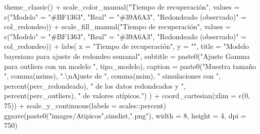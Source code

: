 \documentclass[
]{article}
\newenvironment{Shaded}{\begin{snugshade}}{\end{snugshade}}
\newcommand{\AttributeTok}[1]{\textcolor[rgb]{0.77,0.63,0.00}{#1}}
\newcommand{\DecValTok}[1]{\textcolor[rgb]{0.00,0.00,0.81}{#1}}
\newcommand{\FunctionTok}[1]{\textcolor[rgb]{0.00,0.00,0.00}{#1}}
\newcommand{\NormalTok}[1]{#1}
\newcommand{\OtherTok}[1]{\textcolor[rgb]{0.56,0.35,0.01}{#1}}
\newcommand{\SpecialCharTok}[1]{\textcolor[rgb]{0.00,0.00,0.00}{#1}}
\newcommand{\StringTok}[1]{\textcolor[rgb]{0.31,0.60,0.02}{#1}}
\begin{document}
\begin{Shaded}
\begin{Highlighting}[]
  \FunctionTok{theme\_classic}\NormalTok{() }\SpecialCharTok{+}
  \FunctionTok{scale\_color\_manual}\NormalTok{(}\StringTok{"Tiempo de recuperación"}\NormalTok{,}
                     \AttributeTok{values =} \FunctionTok{c}\NormalTok{(}\StringTok{"Modelo"} \OtherTok{=} \StringTok{"\#BF1363"}\NormalTok{,}
                                \StringTok{"Real"} \OtherTok{=} \StringTok{"\#39A6A3"}\NormalTok{,}
                                \StringTok{"Redondeado (observado)"} \OtherTok{=}\NormalTok{ col\_redondeo)) }\SpecialCharTok{+}
  \FunctionTok{scale\_fill\_manual}\NormalTok{(}\StringTok{"Tiempo de recuperación"}\NormalTok{,}
                    \AttributeTok{values =} \FunctionTok{c}\NormalTok{(}\StringTok{"Modelo"} \OtherTok{=} \StringTok{"\#BF1363"}\NormalTok{,}
                               \StringTok{"Real"} \OtherTok{=} \StringTok{"\#39A6A3"}\NormalTok{,}
                               \StringTok{"Redondeado (observado)"} \OtherTok{=}\NormalTok{ col\_redondeo)) }\SpecialCharTok{+}
  \FunctionTok{labs}\NormalTok{(}
    \AttributeTok{x =} \StringTok{"Tiempo de recuperación"}\NormalTok{, }
    \AttributeTok{y =} \StringTok{""}\NormalTok{,}
    \AttributeTok{title =} \StringTok{"Modelo bayesiano para ajuste de redondeo semanal"}\NormalTok{,}
    \AttributeTok{subtitle =} \FunctionTok{paste0}\NormalTok{(}\StringTok{"Ajuste Gamma para outliers con un modelo "}\NormalTok{, tipo\_modelo),}
    \AttributeTok{caption =} \FunctionTok{paste0}\NormalTok{(}\StringTok{"Muestra tamaño "}\NormalTok{, }\FunctionTok{comma}\NormalTok{(nsims), }\StringTok{".}\SpecialCharTok{\textbackslash{}n}\StringTok{Ajuste de "}\NormalTok{, }
                     \FunctionTok{comma}\NormalTok{(nsim), }\StringTok{" simulaciones con "}\NormalTok{,}
                     \FunctionTok{percent}\NormalTok{(perc\_redondeado), }\StringTok{" de los datos redondeados y "}\NormalTok{, }
                     \FunctionTok{percent}\NormalTok{(perc\_outliers), }\StringTok{" de valores atípicos."}\NormalTok{)}
\NormalTok{  ) }\SpecialCharTok{+}
  \FunctionTok{coord\_cartesian}\NormalTok{(}\AttributeTok{xlim =} \FunctionTok{c}\NormalTok{(}\DecValTok{0}\NormalTok{, }\DecValTok{75}\NormalTok{)) }\SpecialCharTok{+}
  \FunctionTok{scale\_y\_continuous}\NormalTok{(}\AttributeTok{labels =}\NormalTok{ scales}\SpecialCharTok{::}\NormalTok{percent)}
\FunctionTok{ggsave}\NormalTok{(}\FunctionTok{paste0}\NormalTok{(}\StringTok{"images/Atipicos"}\NormalTok{,simdist,}\StringTok{".png"}\NormalTok{), }\AttributeTok{width =} \DecValTok{8}\NormalTok{, }
       \AttributeTok{height =} \DecValTok{4}\NormalTok{, }\AttributeTok{dpi =} \DecValTok{750}\NormalTok{)}
\end{Highlighting}
\end{Shaded}
\end{document}
